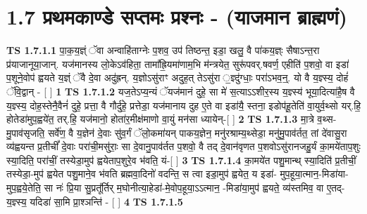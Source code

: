 \documentclass[17pt]{extarticle}
\begin{document}
     \section*{ 1.7     प्रथमकाण्डे सप्तमः प्रश्नः - (याजमान ब्राह्मणं) }
                                        \textbf{ TS 1.7.1.1} \newline
                  पा॒क॒य॒ज्ञ्ं ॅवा अन्वाहि॑ताग्नेः प॒शव॒ उप॑ तिष्ठन्त॒ इडा॒ खलु॒ वै पा॑कय॒ज्ञ्ः सैषाऽन्त॒रा प्र॑याजानूया॒जान्. यज॑मानस्य लो॒केऽव॑हिता॒ तामा᳚ह्रि॒यमा॑णाम॒भि म॑न्त्रयेत॒ सुरू॑पवर्.षवर्ण॒ एहीति॑ प॒शवो॒ वा इडा॑ प॒शूने॒वोप॑ ह्वयते य॒ज्ञ्ं ॅवै दे॒वा अदु॑ह्रन्. य॒ज्ञोऽसु॑राꣳ अदुह॒त् तेऽसु॑रा ॒ज्ञ्दु॑ग्धाः॒ परा॑ऽभव॒न्॒. यो वै य॒ज्ञ्स्य॒ दोहं॑ ॅवि॒द्वान् - [ ] \textbf{  1} \newline
                  \newline
                                \textbf{ TS 1.7.1.2} \newline
                  यज॒तेऽप्य॒न्यं ॅयज॑मानं दुहे॒ सा मे॑ स॒त्याऽऽशीर॒स्य य॒ज्ञ्स्य॑ भूया॒दित्या॑है॒ष वै य॒ज्ञ्स्य॒ दोह॒स्तेनै॒वैनं॑ दुहे॒ प्रत्ता॒ वै गौर्दु॑हे॒ प्रत्तेडा॒ यज॑मानाय दुह ए॒ते वा इडा॑यै॒ स्तना॒ इडोप॑हू॒तेति॑ वा॒युर्व॒थ्सो यर्.हि॒ होतेडा॑मुप॒ह्वये॑त॒ तर्.हि॒ यज॑मानो॒ होता॑र॒मीक्ष॑माणो वा॒युं मन॑सा ध्यायेन्-[ ] \textbf{  2} \newline
                  \newline
                                \textbf{ TS 1.7.1.3} \newline
                  मा॒त्रे व॒थ्स-मु॒पाव॑सृजति॒ सर्वे॑ण॒ वै य॒ज्ञेन॑ दे॒वाः सु॑व॒र्गं ॅलो॒कमा॑यन् पाकय॒ज्ञेन॒ मनु॑रश्राम्य॒थ्सेडा॒ मनु॑मु॒पाव॑र्तत॒ तां दे॑वासु॒रा व्य॑ह्वयन्त प्र॒तीचीं᳚ दे॒वाः परा॑ची॒मसु॑राः॒ सा दे॒वानु॒पाव॑र्तत प॒शवो॒ वै तद् दे॒वान॑वृणत प॒शवोऽसु॑रानजहु॒र्यं का॒मये॑ताप॒शुः स्या॒दिति॒ परा॑चीं॒ तस्येडा॒मुप॑ ह्वयेताप॒शुरे॒व भ॑वति॒ यं-[ ] \textbf{  3} \newline
                  \newline
                                \textbf{ TS 1.7.1.4} \newline
                  का॒मये॑त पशु॒मान्थ् स्या॒दिति॑ प्र॒तीचीं॒ तस्येडा॒-मुप॑ ह्वयेत पशु॒माने॒व भ॑वति ब्रह्मवा॒दिनो॑ वदन्ति॒ स त्वा इडा॒मुप॑ ह्वयेत॒ य इडा॑- मुप॒हूया॒त्मान॒-मिडा॑या-मुप॒ह्वये॒तेति॒ सा नः॑ प्रि॒या सु॒प्रतू᳚र्तिर् म॒घोनीत्या॒हेडा॑-मे॒वोप॒हूया॒ऽऽत्मान॒ -मिडा॑या॒मुप॑ ह्वयते॒ व्य॑स्तमिव॒ वा ए॒तद्-य॒ज्ञ्स्य॒ यदिडा॑ सा॒मि प्रा॒श्ञन्ति॑ - [ ] \textbf{  4} \newline
                  \newline
                                \textbf{ TS 1.7.1.5} \newline
\end{document}
